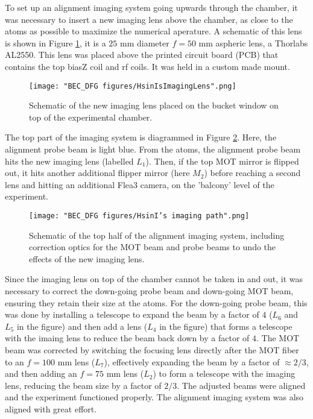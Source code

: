 To set up an alignment imaging system going upwards through the chamber, it was necessary to insert a new imaging lens above the chamber, as close to the atoms as possible to maximize the numerical aperature. A schematic of this lens is shown in Figure \ref{fig:HsinIsImagingLens}, it is a $25$ mm diameter $f=50$ mm aspheric lens, a Thorlabs AL2550. This lens was placed above the printed circuit board (PCB) that contains the top biasZ coil and rf coils. It was held in a custom made mount. 
\begin{figure}
	\texttt{[image: "BEC\_DFG figures/HsinIsImagingLens".png]}
\caption[Schematic of the new imaging lens]{Schematic of the new imaging lens placed on the bucket window on top of the experimental chamber.}
\label{fig:HsinIsImagingLens}
\end{figure}

The top part of the imaging system is diagrammed in Figure \ref{fig:HsinIsImaging}. Here, the alignment probe beam is light blue. From the atoms, the alignment probe beam hits the new imaging lens (labelled $L_1$). Then, if the top MOT mirror is flipped out, it hits another additional flipper mirror (here $M_2$) before reaching a second lens and hitting an additional Flea3 camera, on the 'balcony' level of the experiment. 
\begin{figure}
	\texttt{[image: "BEC\_DFG figures/HsinI's imaging path".png]}
\caption[Schematic of the top half of the alignment imaging system]{Schematic of the top half of the alignment imaging system, including correction optics for the MOT beam and probe beams to undo the effects of the new imaging lens.}
\label{fig:HsinIsImaging}
\end{figure}
Since the imaging lens on top of the chamber cannot be taken in and out, it was necessary to correct the down-going probe beam and down-going MOT beam, ensuring they retain their size at the atoms. For the down-going probe beam, this was done by installing a telescope to expand the beam by a factor of $4$ ($L_6$ and $L_5$ in the figure) and then add a lens ($L_4$ in the figure) that forms a telescope with the imaing lens to reduce the beam back down by a factor of $4$. The MOT beam was corrected by switching the focusing lens directly after the MOT fiber to an $f=100$ mm lens ($L_7$), effectively expanding the beam by a factor of $\approx2/3$, and then adding an $f=75$ mm lens ($L_2$) to form a telescope with the imaging lens, reducing the beam size by a factor of $2/3$. The adjusted beams were aligned and the experiment functioned properly. The alignment imaging system was also aligned with great effort.


